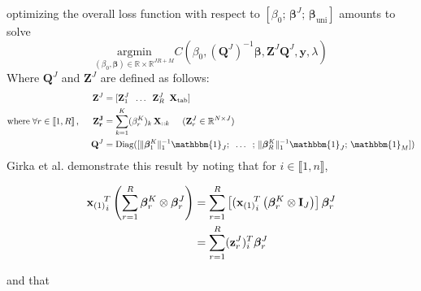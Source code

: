 \documentclass[preprint,12pt]{elsarticle}
\begin{document}
\noindent optimizing the overall loss function with respect to $\left[ \beta_0;\, \bm{\beta}^J ;\, \bm{\beta}_{\text{uni}}  \right]$ amounts to solve
\begin{equation}
    \underset{(\beta_0, \bm{\beta}) \in \mathbb{R} \times \mathbb{R}^{JR + M}}{\text{argmin}}  C(\beta_0, (\mathbf{Q}^J)^{-1}\bm{\beta},\mathbf{Z}^J \mathbf{Q}^J, \mathbf{y}, \lambda)
\end{equation}
\noindent Where $\mathbf{Q}^J$ and $\mathbf{Z}^J$ are defined as follows:
\begin{align}
    \mathbf{Z}^J                                                                               & = [\mathbf{Z}_1^J \; \; \hdots \; \; \mathbf{Z}_R^J \; \;  \mathbf{X}_{\text{tab}}]                                                                             \\
    \text{where} \; \forall r \in \llbracket 1, R\rrbracket\, , \hspace{0.5 cm} \mathbf{Z_r^J} & = \sum\limits_{k = 1}^K (\beta_r^K)_k  \, \mathbf{X}_{::k} \hspace{0.5 cm} (\mathbf{Z}_r^J \in \mathbb{R}^{N \times J})                                             \\
    \hspace{7 pt}
    \mathbf{Q}^J                                                                               & = \text{Diag}([\lVert \bm{\beta}_1^K \rVert_1^{-1} \mathbbm{1}_J; \; \; \hdots \; \; ;\, \lVert \bm{\beta}_R^K \rVert_1^{-1} \mathbbm{1}_J ;\,  \mathbbm{1}_M])
\end{align}
\hspace{10 pt}
\noindent Girka et al. \cite{multi_rank_r} demonstrate this result by noting that for $i \in \llbracket 1, n\rrbracket$,

\begin{align}
    {{\mathbf{x}_{(1)}}_i}^{\hspace{-5 pt} T} \left( \sum\limits_{r = 1}^R \bm{\beta}_r^K \otimes \bm{\beta}_r^J \right) & = \sum\limits_{r = 1}^R \left[({{\mathbf{x}_{(1)}}_i}^{\hspace{-5 pt} T}   \left( \bm{\beta}_r^K  \otimes \mathbf{I}_J\right)\right] \bm{\beta}_r^J \\
                                                                                                                         & = \sum\limits_{r = 1}^R (\mathbf{z}_r^J)_i^T \bm{\beta}_r^J
\end{align}

\noindent and that
\end{document}
